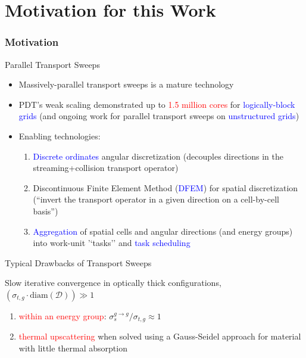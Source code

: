 \documentclass[compress,10pt]{beamer}
\newcommand{\tcr}[1]{\textcolor{red}{#1}}
\newcommand{\tcb}[1]{\textcolor{blue}{#1}}
\begin{document}
\section{Motivation for this Work}
\typeout{***********************************************************************************}
\begin{frame}[t]\frametitle{Motivation}
\vspace{-2mm}
\begin{block}{Parallel Transport Sweeps}
{\small
\begin{itemize}
\item Massively-parallel transport sweeps is a mature technology 
\item PDT's weak scaling demonstrated up to \tcr{1.5 million cores} for \tcb{logically-block grids}
(and ongoing work for parallel transport sweeps on \tcb{unstructured grids})
\item Enabling technologies:
\begin{enumerate}
\item \tcb{Discrete ordinates} angular discretization (decouples directions in the streaming+collision transport operator)
\item Discontinuous Finite Element Method (\tcb{DFEM}) for spatial discretization (``invert the transport operator in a given direction on a cell-by-cell basis'')
\item \tcb{Aggregation} of spatial cells and angular directions (and energy groups) into work-unit '`tasks'' and \tcb{task scheduling}  
\end{enumerate}
\end{itemize}
}
\end{block}
\vspace{-1mm}
\begin{block}{Typical Drawbacks of Transport Sweeps}
{\small
Slow iterative convergence in optically thick configurations, $\left( \sigma_{t,g} \cdot \text{diam} (\mathcal{D}) \right) \gg 1$
\begin{enumerate}
\item \tcr{within an energy group}: 
$\sigma_s^{g \rightarrow g} / {\sigma_{t,g}} \approx  1$ 
\item \tcr{thermal upscattering} when solved using a Gauss-Seidel approach for material with little thermal absorption
\end{enumerate}
}
\end{block}

\end{frame}
\end{document}
